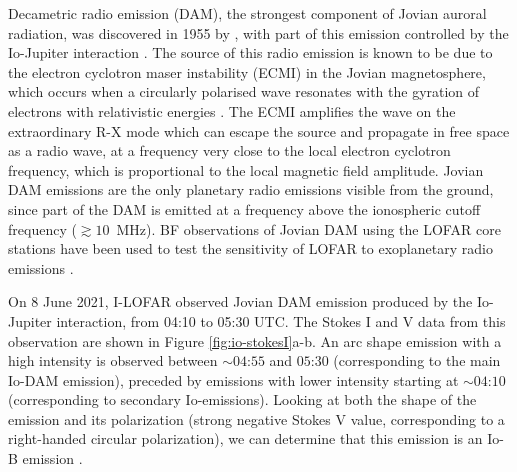 Decametric radio emission (DAM), the strongest component of Jovian auroral radiation, was discovered in 1955 by \cite{Burke1955}, with part of this emission controlled by the Io-Jupiter interaction \citep{Bigg1964}. The source of this radio emission is known to be due to the electron cyclotron maser instability (ECMI) in the Jovian magnetosphere, which occurs when a circularly polarised wave resonates with the gyration of electrons with relativistic energies \citep{Wu1979,Wu1985,Zarka1998, Treumann2006,Louarn2017GRL}. The ECMI amplifies the wave on the extraordinary R-X mode which can escape the source and propagate in free space as a radio wave, at a frequency very close to the local electron cyclotron frequency, which is proportional to the local magnetic field amplitude. Jovian DAM emissions are the only planetary radio emissions visible from the ground, since part of the DAM is emitted at a frequency above the ionospheric cutoff frequency ($\gtrsim 10$~MHz). BF observations of Jovian DAM using the LOFAR core stations have been used to test the sensitivity of LOFAR to exoplanetary radio emissions \citep{Turner2019, Turner2021}.


On 8 June 2021, I-LOFAR observed Jovian DAM emission produced by the Io-Jupiter interaction, from 04:10 to 05:30 UTC. The Stokes I and V data from this observation are shown in Figure \ref{fig:io-stokesI}a-b. An arc shape emission with a high intensity is observed between $\sim 04$:$55$ and $05$:$30$ (corresponding to the main Io-DAM emission), preceded by emissions with lower intensity starting at $\sim 04$:$10$ (corresponding to secondary Io-emissions). Looking at both the shape of the emission and its polarization (strong negative Stokes V value, corresponding to a right-handed circular polarization), we can determine that this emission is an Io-B emission \citep[coming from the north-dawn side of Jupiter, see][for example]{Marques2017}.


